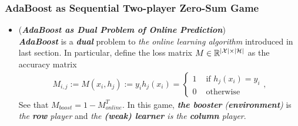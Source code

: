 \documentclass[11pt]{article}
\begin{document}
\subsubsection{AdaBoost as Sequential Two-player Zero-Sum Game}
\begin{itemize}
\item \begin{remark}(\textbf{\emph{AdaBoost as Dual Problem of Online Prediction}}) \citep{schapire2012boosting, mohri2018foundations} \\
\emph{\textbf{AdaBoost}} is a \emph{\textbf{dual}} problem to \emph{the online learning algorithm} introduced in last section. In particular, define the loss matrix $M \in {\mathbb R}^{\left\lvert {\mathcal X} \right\rvert \times \left\lvert {\mathcal H} \right\rvert}$ as the accuracy matrix
\begin{align*}
M_{i,j} := M(x_i, h_j) :=  y_i h_j(x_i) = \left\{ \begin{array}{cc}
1 &\text{ if }h_j(x_i) = y_i \\
0 &\text{ otherwise}
\end{array}
\right. ,
\end{align*} See that $M_{boost} = 1 - M_{online}^{T}$. In this game, \emph{\textbf{the booster} (\textbf{environment})} is \emph{the \textbf{row} player} and \emph{the \textbf{(weak) learner} is the \textbf{column} player}. 


\end{remark}
\end{itemize}
\end{document}
